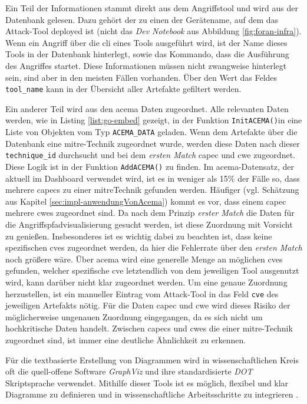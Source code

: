 \par Ein Teil der Informationen stammt direkt aus dem Angriffstool und wird aus der Datenbank gelesen. Dazu gehört der zu einen der Gerätename, auf dem das Attack-Tool deployed ist (nicht das \textit{Dev Notebook} aus Abbildung \ref{fig:foran-infra}). Wenn ein Angriff über die \gls{cli} eines Tools ausgeführt wird, ist der Name dieses Tools in der Datenbank hinterlegt, sowie das Kommando, dass die Ausführung des Angriffes startet. Diese Informationen müssen nicht zwangweise hinterlegt sein, sind aber in den meisten Fällen vorhanden. Über den Wert das Feldes \verb|tool_name| kann in der Übersicht aller Artefakte gefiltert werden.
\par Ein anderer Teil wird aus den \gls{acema} Daten zugeordnet. Alle relevanten Daten werden, wie in Listing \ref{list:go-embed} gezeigt, in der Funktion \verb|InitACEMA()|in eine Liste von Objekten vom Typ \verb|ACEMA_DATA| geladen. Wenn dem Artefakte über die Datenbank eine \gls{mitre}-Technik zugeordnet wurde, werden diese Daten nach dieser \verb|technique_id| durchsucht und bei dem \textit{ersten Match} \gls{capec} und \gls{cwe} zugeordnet. Diese Logik ist in der Funktion \verb|AddACEMA()| zu finden. Im \gls{acema}-Datensatz, der aktuell im Dashboard verwendet wird, ist es in weniger als 15\% der Fälle so, dass mehrere \glspl{capec} zu einer \gls{mitre}Technik gefunden werden. Häufiger (vgl. Schätzung aus Kapitel \ref{sec:impl-anwendungVonAcema}) kommt es vor, dass einem \gls{capec} mehrere \glspl{cwe} zugeordnet sind. Da nach dem Prinzip \textit{erster Match} die Daten für die Angriffspfadvisualisierung gesucht werden, ist diese Zuordnung mit Vorsicht zu genießen. Insbesonderes ist es wichtig dabei zu beachten ist, dass keine spezifischen \glspl{cve} zugeordnet werden, da hier die Fehlerrate über den \textit{ersten Match} noch größere wäre. Über \gls{acema} wird eine generelle Menge an möglichen \glspl{cve} gefunden, welcher spezifische \gls{cve} letztendlich von dem jeweiligen Tool ausgenutzt wird, kann darüber nicht klar zugeordnet werden. Um eine genaue Zuordnung herzustellen, ist ein manueller Eintrag vom Attack-Tool in das Feld \verb|cve| des jeweiligen Artefakts nötig. Für die Daten \gls{capec} und \gls{cwe} wird dieses Risiko der möglicherweise ungenauen Zuordnung eingegangen, da es sich nicht um hochkritische Daten handelt. Zwischen \glspl{capec} und \glspl{cwe} die einer \gls{mitre}-Technik zugeordnet sind, ist immer eine deutliche Ähnlichkeit zu erkennen.
\par Für die textbasierte Erstellung von Diagrammen wird in wissenschaftlichen Kreis oft die quell-offene Software \textit{GraphViz} und ihre standardisierte \textit{DOT} Skriptsprache verwendet. Mithilfe dieser Tools ist es möglich, flexibel und klar Diagramme zu definieren und in wissenschaftliche Arbeitsschritte zu integrieren \autocite{Graphviz} \autocite{DOTLanguage}.

